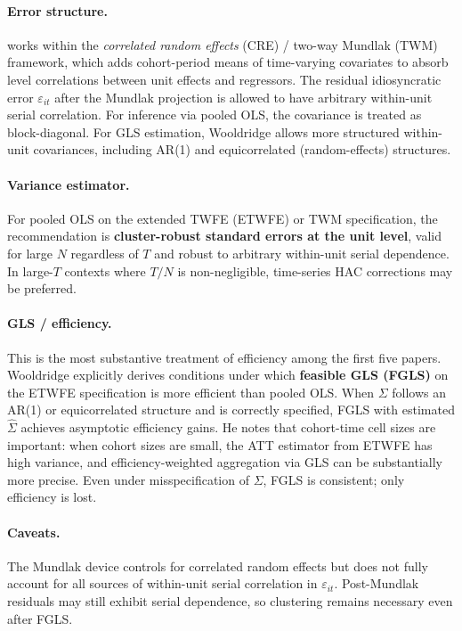 \documentclass[12pt]{article}
\begin{document}
\paragraph{Error structure.}
\citet{wooldridge2025twoway} works within the \textit{correlated random effects}
(CRE) / two-way Mundlak (TWM) framework, which adds cohort-period means of
time-varying covariates to absorb level correlations between unit effects and
regressors.
The residual idiosyncratic error $\varepsilon_{it}$ after the Mundlak projection
is allowed to have arbitrary within-unit serial correlation.
For inference via pooled OLS, the covariance is treated as block-diagonal.
For GLS estimation, Wooldridge allows more structured within-unit covariances,
including AR(1) and equicorrelated (random-effects) structures.

\paragraph{Variance estimator.}
For pooled OLS on the extended TWFE (ETWFE) or TWM specification, the
recommendation is \textbf{cluster-robust standard errors at the unit level},
valid for large $N$ regardless of $T$ and robust to arbitrary within-unit serial
dependence.
In large-$T$ contexts where $T / N$ is non-negligible, time-series HAC
corrections may be preferred.

\paragraph{GLS / efficiency.}
This is the most substantive treatment of efficiency among the first five papers.
Wooldridge explicitly derives conditions under which \textbf{feasible GLS (FGLS)}
on the ETWFE specification is more efficient than pooled OLS.
When $\Sigma$ follows an AR(1) or equicorrelated structure and is correctly
specified, FGLS with estimated $\hat{\Sigma}$ achieves asymptotic efficiency gains.
He notes that cohort-time cell sizes are important: when cohort sizes are small,
the ATT estimator from ETWFE has high variance, and efficiency-weighted
aggregation via GLS can be substantially more precise.
Even under misspecification of $\Sigma$, FGLS is consistent; only efficiency
is lost.

\paragraph{Caveats.}
The Mundlak device controls for correlated random effects but does not
fully account for all sources of within-unit serial correlation in
$\varepsilon_{it}$.
Post-Mundlak residuals may still exhibit serial dependence, so clustering
remains necessary even after FGLS.
\end{document}
